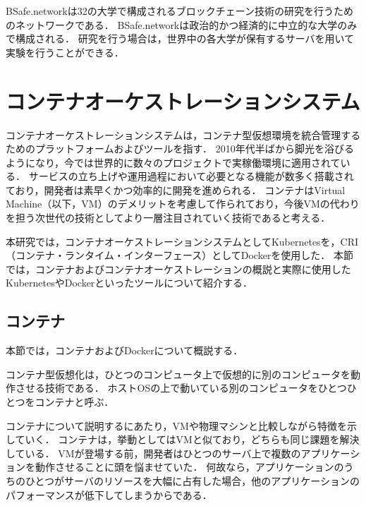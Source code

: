 BSafe.networkは32の大学で構成されるブロックチェーン技術の研究を行うためのネットワークである．
BSafe.networkは政治的かつ経済的に中立的な大学のみで構成される．
研究を行う場合は，世界中の各大学が保有するサーバを用いて実験を行うことができる．

\section{コンテナオーケストレーションシステム}
\label{background:container-orchestration-system}

コンテナオーケストレーションシステムは，コンテナ型仮想環境を統合管理するためのプラットフォームおよびツールを指す．
2010年代半ばから脚光を浴びるようになり，今では世界的に数々のプロジェクトで実稼働環境に適用されている．
サービスの立ち上げや運用過程において必要となる機能が数多く搭載されており，開発者は素早くかつ効率的に開発を進められる．
コンテナはVirtual Machine（以下，VM）のデメリットを考慮して作られており，今後VMの代わりを担う次世代の技術としてより一層注目されていく技術であると考える．

本研究では，コンテナオーケストレーションシステムとしてKubernetesを，CRI（コンテナ・ランタイム・インターフェース）としてDockerを使用した．
本節では，コンテナおよびコンテナオーケストレーションの概説と実際に使用したKubernetesやDockerといったツールについて紹介する．

\subsection{コンテナ}
\label{background:container-orchestration-system:container}

本節では，コンテナおよびDockerについて概説する．

コンテナ型仮想化は，ひとつのコンピュータ上で仮想的に別のコンピュータを動作させる技術である．
ホストOSの上で動いている別のコンピュータをひとつひとつをコンテナと呼ぶ．

コンテナについて説明するにあたり，VMや物理マシンと比較しながら特徴を示していく．
コンテナは，挙動としてはVMと似ており，どちらも同じ課題を解決している．
VMが登場する前，開発者はひとつのサーバ上で複数のアプリケーションを動作させることに頭を悩ませていた．
何故なら，アプリケーションのうちのひとつがサーバのリソースを大幅に占有した場合，他のアプリケーションのパフォーマンスが低下してしまうからである．

